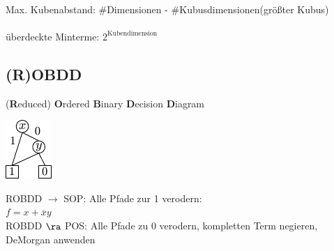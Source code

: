 \documentclass[6pt,a4paper]{scrartcl}
\begin{document}
\begin{multicols}{3}
{	\\
	Max. Kubenabstand: \#Dimensionen - \#Kubusdimensionen(größter Kubus) \\
	} \\
	überdeckte Minterme: $2^{\text{Kubendimension}}$
	\subsection{(R)OBDD}
	(\textbf{R}educed) \textbf{O}rdered \textbf{B}inary \textbf{D}ecision \textbf{D}iagram\\
	\parbox{2.0cm}{ \includegraphics{./img/ds/robdd.pdf} }
	\parbox{5.0cm}{ ROBDD $\rightarrow$ SOP: Alle Pfade zur 1 verodern:\\ $f = x + \overline xy$ \\ 
					ROBDD $ \ra$ POS: Alle Pfade zu 0 verodern, kompletten Term negieren, DeMorgan anwenden} \\
	



\end{multicols}
\end{document}

